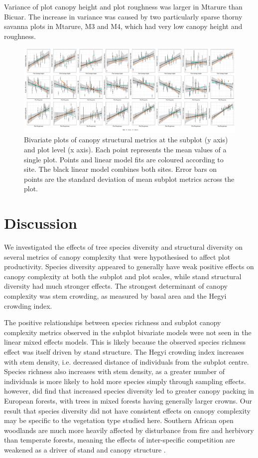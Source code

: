 \documentclass[11pt,a4paper]{article}
\begin{document}
Variance of plot canopy height and plot roughness was larger in Mtarure than Bicuar. The increase in variance was caused by two particularly sparse thorny savanna plots in Mtarure, M3 and M4, which had very low canopy height and roughness.


\begin{figure}[H]
\centering
	\includegraphics[width=\textwidth]{plot_subplot_bivar}
	\caption{Bivariate plots of canopy structural metrics at the subplot (y axis) and plot level (x axis). Each point represents the mean values of a single plot. Points and linear model fits are coloured according to site. The black linear model combines both sites. Error bars on points are the standard deviation of mean subplot metrics across the plot.}
	\label{plot_subplot_bivar}
\end{figure}



\section{Discussion}

We investigated the effects of tree species diversity and structural diversity on several metrics of canopy complexity that were hypothesised to affect plot productivity. Species diversity appeared to generally have weak positive effects on canopy complexity at both the subplot and plot scales, while stand structural diversity had much stronger effects. The strongest determinant of canopy complexity was stem crowding, as measured by basal area and the Hegyi crowding index.

The positive relationships between species richness and subplot canopy complexity metrics observed in the subplot bivariate models were not seen in the linear mixed effects models. This is likely because the observed species richness effect was itself driven by stand structure. The Hegyi crowding index increases with stem density, i.e. decreased distance of individuals from the subplot centre. Species richness also increases with stem density, as a greater number of individuals is more likely to hold more species simply through sampling effects. \citet{Jucker2015} however, did find that increased species diversity led to greater canopy packing in European forests, with trees in mixed forests having generally larger crowns. Our result that species diversity did not have consistent effects on canopy complexity may be specific to the vegetation type studied here. Southern African open woodlands are much more heavily affected by disturbance from fire and herbivory than temperate forests, meaning the effects of inter-specific competition are weakened as a driver of stand and canopy structure \citep{}.
\end{document}
